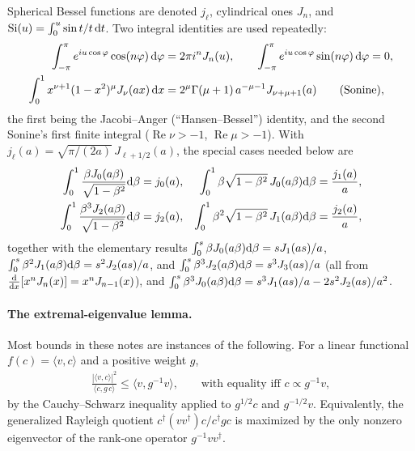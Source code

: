 \documentclass[11pt,letterpaper]{article}
\renewcommand{\Re}{\operatorname{Re}}
\newcommand{\Si}{\operatorname{Si}}
\begin{document}
Spherical Bessel functions are denoted $j_\ell$, cylindrical ones $J_n$, and $\Si(u)=\int_0^u \sin t/t\,{\rm d}t$. Two integral identities are used repeatedly:
\begin{align}
    \int_{-\pi}^{\pi} e^{iu\cos\varphi}\cos(n\varphi)\,{\rm d}\varphi &= 2\pi i^n J_n(u), \qquad \int_{-\pi}^{\pi} e^{iu\cos\varphi}\sin(n\varphi)\,{\rm d}\varphi = 0, \label{eq:JA}\\
    \int_0^1 x^{\nu+1}(1-x^2)^{\mu} J_\nu(ax)\,{\rm d}x &= 2^{\mu}\Gamma(\mu+1)\,a^{-\mu-1}J_{\nu+\mu+1}(a) \qquad(\text{Sonine}), \label{eq:Sonine}
\end{align}
the first being the Jacobi--Anger (``Hansen--Bessel'') identity, and the second Sonine's first finite integral ($\Re\nu>-1$, $\Re\mu>-1$). With $j_\ell(a)=\sqrt{\pi/(2a)}\,J_{\ell+1/2}(a)$, the special cases needed below are
\begin{align}
    \int_0^1 \frac{\beta J_0(a\beta)}{\sqrt{1-\beta^2}}{\rm d}\beta &= j_0(a), &
    \int_0^1 \beta\sqrt{1-\beta^2}\,J_0(a\beta){\rm d}\beta &= \frac{j_1(a)}{a}, \nonumber\\
    \int_0^1 \frac{\beta^3 J_2(a\beta)}{\sqrt{1-\beta^2}}{\rm d}\beta &= j_2(a), &
    \int_0^1 \beta^2\sqrt{1-\beta^2}\,J_1(a\beta){\rm d}\beta &= \frac{j_2(a)}{a}, \label{eq:SonineCases}
\end{align}
together with the elementary results $\int_0^s \beta J_0(a\beta){\rm d}\beta = sJ_1(as)/a$, $\int_0^s\beta^2J_1(a\beta){\rm d}\beta=s^2J_2(as)/a$, and $\int_0^s\beta^3J_2(a\beta){\rm d}\beta=s^3J_3(as)/a$ (all from $\tfrac{{\rm d}}{{\rm d}x}[x^{n}J_n(x)]=x^nJ_{n-1}(x)$), and $\int_0^s\beta^3J_0(a\beta){\rm d}\beta = s^3J_1(as)/a-2s^2J_2(as)/a^2$.

\paragraph{The extremal-eigenvalue lemma.} Most bounds in these notes are instances of the following. For a linear functional $f(c)=\langle v,c\rangle$ and a positive weight $g$,
\begin{align}
    \frac{|\langle v,c\rangle|^2}{\langle c, g\,c\rangle} \le \langle v, g^{-1} v\rangle, \qquad \text{with equality iff } c\propto g^{-1}v,
    \label{eq:CS}
\end{align}
by the Cauchy--Schwarz inequality applied to $g^{1/2}c$ and $g^{-1/2}v$. Equivalently, the generalized Rayleigh quotient $c^\dagger(vv^\dagger)c/c^\dagger gc$ is maximized by the only nonzero eigenvector of the rank-one operator $g^{-1}vv^\dagger$.
\end{document}
